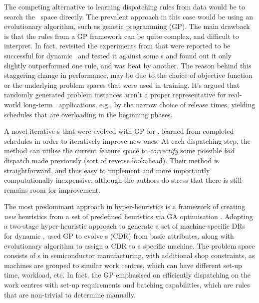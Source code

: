 \documentclass[twocolumn]{svjour3}
\begin{document}
The competing alternative to learning dispatching rules from data would be to 
search the \dr\ space directly. The prevalent approach in this case would be 
using an evolutionary algorithm, such as genetic programming (GP).
The main drawback is that the rules from a GP framework can be quite complex, 
and difficult to interpret.
In fact, \cite{Hildebrandt2010} revisited the experiments from \cite{Tay08} 
that were reported to be successful for dynamic \jsp\ and tested it against 
some \sdr s and found out it only slightly outperformed one rule, 
and was beat by another. 
The reason behind this staggering change in performance, may be due to 
the choice of objective function or the underlying problem spaces that were 
used in training.
It's argued that  randomly generated problem instances aren't a 
proper representative for real-world long-term \jsp\ applications, e.g., by the 
narrow choice of release times, yielding schedules that are overloading in the 
beginning phases.

A novel iterative \dr s that were evolved with GP for \JSP, \cite{Nguyen13} 
learned from completed schedules in order to iteratively improve new ones. 
At each dispatching step, the method can utilise the current feature space to 
\emph{correctify} some possible \emph{bad} dispatch made previously (sort of 
reverse lookahead). Their method is straightforward, and thus easy to 
implement and more importantly computationally inexpensive, although the 
authors do stress that there is still remains room for improvement.


The most predominant approach in hyper-heuristics is a framework of creating 
\emph{new} heuristics from a set of  predefined heuristics via GA optimisation 
\cite{Burke10}. 
Adopting a two-stage hyper-heuristic approach to generate a set of 
machine-specific DRs for dynamic \jsp, \cite{Pickardt2013} used GP to evolve 
\cdr s (CDR) from basic attributes, along with evolutionary algorithm to assign 
a CDR to a specific machine. 
The problem space consists of \jsp s in semiconductor manufacturing, with 
additional shop constraints, as machines are grouped to similar work centres, 
which can have different set-up time, workload, etc. 
In fact, the GP emphasised on efficiently dispatching on the work centres with 
set-up requirements and batching capabilities, which are rules that are 
non-trivial to determine manually.

\end{document}
